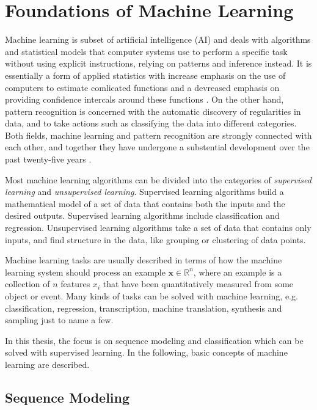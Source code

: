 \documentclass{scrartcl}
\begin{document}
\newpage
\section{Foundations of Machine Learning}

Machine learning is subset of artificial intelligence (AI) and deals with algorithms and statistical models that computer systems use to perform a specific task without using explicit instructions, relying on patterns and inference instead. It is essentially a form of applied statistics with increase emphasis on the use of computers to estimate comlicated functions and a devreased emphasis on providing confidence intercals around these functions \cite{Goodfellow2016}. On the other hand, pattern recognition is concerned with the automatic discovery of regularities in data, and to take actions such as classifying the data into different categories. Both fields, machine learning and pattern recognition are strongly connected with each other, and together they have undergone a substential development over the past twenty-five years \cite{Bishop2006}.

Most machine learning algorithms can be divided into the categories of \emph{supervised learning} and \emph{unsupervised learning}. Supervised learning algorithms build a mathematical model of a set of data that contains both the inputs and the desired outputs. Supervised learning algorithms include classification and regression. Unsupervised learning algorithms take a set of data that contains only inputs, and find structure in the data, like grouping or clustering of data points. 

Machine learning tasks are usually described in terms of how the machine learning system should process an example $\mathbf x \in \mathbb R^n$, where an example is a collection of $n$ features $x_i$ that have been quantitatively measured from some object or event. Many kinds of tasks can be solved with machine learning, e.g. classification, regression, transcription, machine translation, synthesis and sampling just to name a few.

In this thesis, the focus is on sequence modeling and classification which can be solved with supervised learning. In the following, basic concepts of machine learning are described. 


\subsection{Sequence Modeling}
\end{document}
